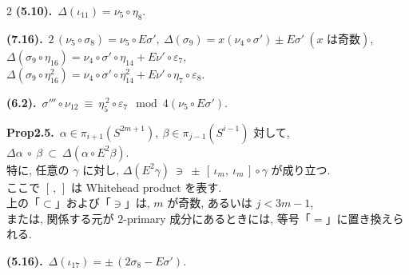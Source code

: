 \documentclass[10pt, leqno]{ltjsarticle}
\numberwithin{equation}{section}
\theoremstyle{plain}
\theoremstyle{definition}
\theoremstyle{remark}
\begin{document}
\begin{paracol}{2}
\noindent
\textbf{(5.10).}\
\(\Delta(\iota_{11})=\nu_5\circ\eta_8 .\)

\noindent
\textbf{(7.16).}\
\(2\,(\nu_{5}\circ\sigma_{8}) = \nu_{5}\circ E\sigma',\
\Delta(\sigma_{9}) = x(\nu_{4}\circ\sigma') \pm E\sigma'
\ (\text{$x$ は奇数}),\)\\
\(\Delta(\sigma_{9}\circ\eta_{16}) 
= \nu_{4}\circ\sigma'\circ\eta_{14} + E\nu'\circ\varepsilon_{7},\)\\
\(\Delta(\sigma_9\circ\eta_{16}^2) = \nu_4\circ\sigma'\circ\eta_{14}^2
+ E\nu'\circ\eta_7\circ\varepsilon_8. \)

\noindent
\textbf{(6.2).}\ 
\(\sigma'''\circ \nu_{12}\ \equiv\ \eta_5^{\,2}\circ \varepsilon_7
\mod{4(\nu_5\circ E\sigma')} .\)

\noindent
\textbf{Prop2.5.}\
$\alpha\in\pi_{i+1}(S^{2m+1}), \ \beta\in \pi_{j-1}(S^{i-1})$ 対して, 
\(
\Delta\alpha\ \circ\ \beta\ \subset\ \Delta(\alpha\circ E^2\beta).
\)\\
特に, 任意の $\gamma$ に対し,
\(
\Delta(E^2\gamma)\ \ni\ \pm\,[\,\iota_m,\ \iota_m\,]\circ\gamma
\)
が成り立つ. \\
ここで $[\, ,\,]$ は Whitehead product を表す. \\
上の「$\subset$」および「$\ni$」は, $m$ が奇数, 
あるいは $j<3m-1$, \\
または, 関係する元が \(2\)-primary 成分にあるときには, 
等号「$=$」に置き換えられる. 

\noindent
\textbf{(5.16).}\
\(\Delta(\iota_{17})=\pm\,(2\sigma_{8}-E\sigma').\)






\end{paracol}
\end{document}
